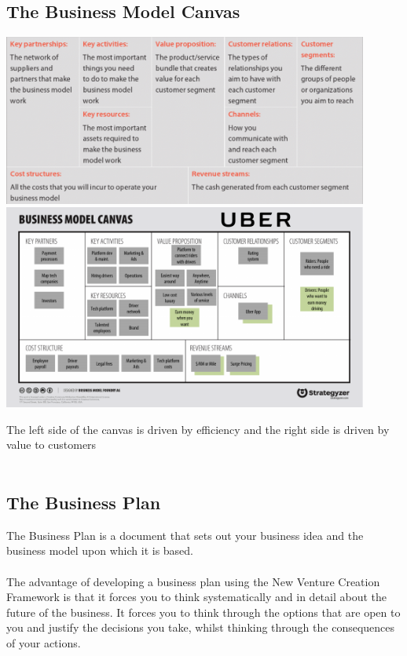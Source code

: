\documentclass{article}[18pt]
\begin{document}
\subsection{The Business Model Canvas}
\begin{center}
\includegraphics[width=12cm]{business_model_canvas.png}\\
\includegraphics[width=12cm]{uber_canvas.png}
\end{center}
The left side of the canvas is driven by efficiency and the right side is driven by value to customers\\
\\
\subsection{The Business Plan}
The Business Plan is a document that sets out your business idea and the business model upon which it is based.\\
\\
The advantage of developing a business plan using the New Venture Creation Framework is that it forces you to think systematically and in detail about the future of the business. It forces you to think through the options that are open to you and justify the decisions you take, whilst thinking through the consequences of your actions.
\end{document}
